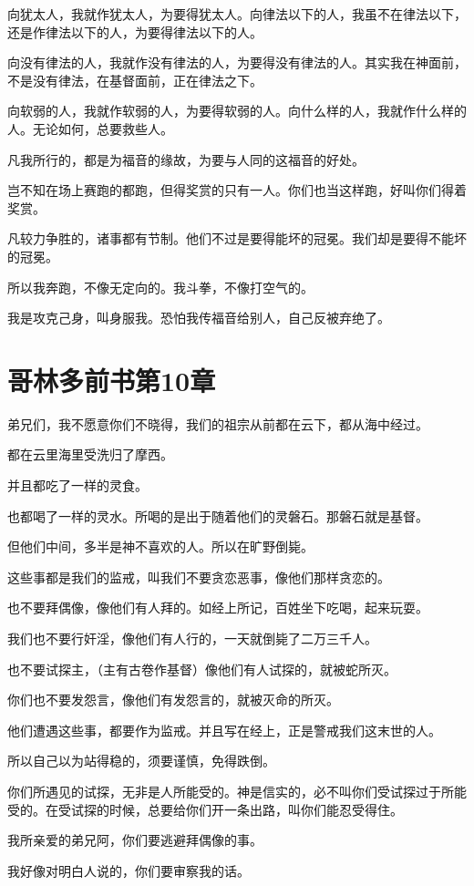 \documentclass[12pt,oneside]{book}
\begin{document}
向犹太人，我就作犹太人，为要得犹太人。向律法以下的人，我虽不在律法以下，还是作律法以下的人，为要得律法以下的人。

向没有律法的人，我就作没有律法的人，为要得没有律法的人。其实我在神面前，不是没有律法，在基督面前，正在律法之下。

向软弱的人，我就作软弱的人，为要得软弱的人。向什么样的人，我就作什么样的人。无论如何，总要救些人。

凡我所行的，都是为福音的缘故，为要与人同的这福音的好处。

岂不知在场上赛跑的都跑，但得奖赏的只有一人。你们也当这样跑，好叫你们得着奖赏。

凡较力争胜的，诸事都有节制。他们不过是要得能坏的冠冕。我们却是要得不能坏的冠冕。

所以我奔跑，不像无定向的。我斗拳，不像打空气的。

我是攻克己身，叫身服我。恐怕我传福音给别人，自己反被弃绝了。

\chapter{哥林多前书第10章}
弟兄们，我不愿意你们不晓得，我们的祖宗从前都在云下，都从海中经过。

都在云里海里受洗归了摩西。

并且都吃了一样的灵食。

也都喝了一样的灵水。所喝的是出于随着他们的灵磐石。那磐石就是基督。

但他们中间，多半是神不喜欢的人。所以在旷野倒毙。

这些事都是我们的监戒，叫我们不要贪恋恶事，像他们那样贪恋的。

也不要拜偶像，像他们有人拜的。如经上所记，百姓坐下吃喝，起来玩耍。

我们也不要行奸淫，像他们有人行的，一天就倒毙了二万三千人。

也不要试探主，（主有古卷作基督）像他们有人试探的，就被蛇所灭。

你们也不要发怨言，像他们有发怨言的，就被灭命的所灭。

他们遭遇这些事，都要作为监戒。并且写在经上，正是警戒我们这末世的人。

所以自己以为站得稳的，须要谨慎，免得跌倒。

你们所遇见的试探，无非是人所能受的。神是信实的，必不叫你们受试探过于所能受的。在受试探的时候，总要给你们开一条出路，叫你们能忍受得住。

我所亲爱的弟兄阿，你们要逃避拜偶像的事。

我好像对明白人说的，你们要审察我的话。
\end{document}
